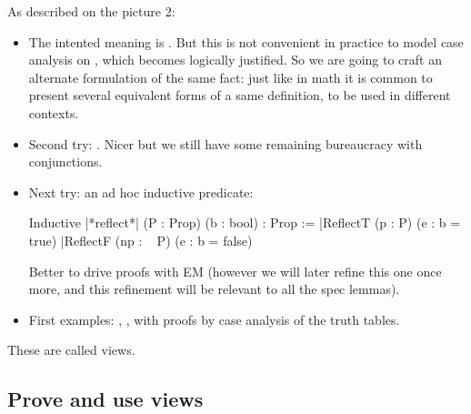 As described on the picture 2:
\begin{itemize}
\item The intented meaning is . But this is not
  convenient in practice to model case analysis on , which
  becomes logically justified. So we are going to craft an alternate
  formulation of the same fact: just like in math it is common to
  present several equivalent forms of a same definition, to be used in
  different contexts.

\item Second try: . Nicer
  but we still have some remaining bureaucracy with conjunctions.

\item Next try: an ad hoc inductive predicate:

\begin{coq}{}{}
Inductive |*reflect*| (P : Prop) (b : bool) : Prop :=
|ReflectT (p : P)    (e : b = true)
|ReflectF (np : ~ P) (e : b = false)
\end{coq}

Better to drive proofs with EM (however we will later refine this one
once more, and this refinement will be relevant to all the spec
lemmas).

\item First examples: , ,  with proofs by
  case analysis of the truth tables.
\end{itemize}
These are called views.

\subsection{Prove and use views}

